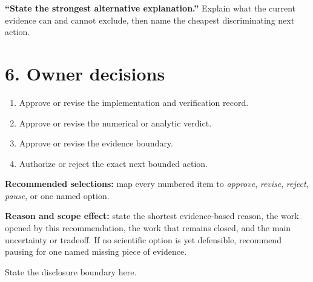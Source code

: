 \documentclass[11pt]{article}
\begin{document}
\textbf{``State the strongest alternative explanation.''} Explain what the
current evidence can and cannot exclude, then name the cheapest discriminating
next action.

\section*{6. Owner decisions}

\begin{enumerate}[itemsep=5pt,leftmargin=2em]
\item Approve or revise the implementation and verification record.
\item Approve or revise the numerical or analytic verdict.
\item Approve or revise the evidence boundary.
\item Authorize or reject the exact next bounded action.
\end{enumerate}

\textbf{Recommended selections:} map every numbered item to \emph{approve},
\emph{revise}, \emph{reject}, \emph{pause}, or one named option.

\textbf{Reason and scope effect:} state the shortest evidence-based reason,
the work opened by this recommendation, the work that remains closed, and the
main uncertainty or tradeoff. If no scientific option is yet defensible,
recommend pausing for one named missing piece of evidence.

\vfill
\begin{center}
\small State the disclosure boundary here.
\end{center}
\end{document}
